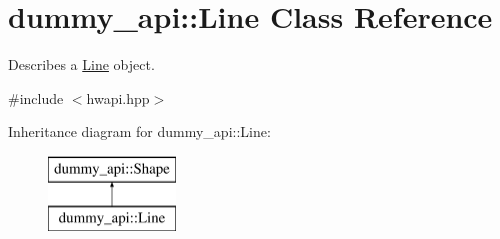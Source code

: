 \hypertarget{classdummy__api_1_1Line}{}\section{dummy\+\_\+api\+:\+:Line Class Reference}
\label{classdummy__api_1_1Line}


Describes a \mbox{\hyperlink{classdummy__api_1_1Line}{Line}} object.  




{\ttfamily \#include $<$hwapi.\+hpp$>$}

Inheritance diagram for dummy\+\_\+api\+:\+:Line\+:\begin{figure}[H]
\begin{center}
\leavevmode
\includegraphics[height=2.000000cm]{classdummy__api_1_1Line}
\end{center}
\end{figure}
